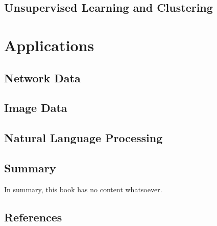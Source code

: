 \documentclass[
  letterpaper,
  DIV=11,
  numbers=noendperiod,
  oneside]{scrreprt}
\newlength{\cslhangindent}
\newlength{\cslentryspacingunit} %
\newenvironment{CSLReferences}[2] %
 {%
  \setlength{\parindent}{0pt}
  \ifodd #1
  \let\oldpar\par
  \def\par{\hangindent=\cslhangindent\oldpar}
  \fi
  \setlength{\parskip}{#2\cslentryspacingunit}
 }%
 {}
\begin{document}
\hypertarget{unsupervised-learning-and-clustering}{%
\chapter{Unsupervised Learning and
Clustering}\label{unsupervised-learning-and-clustering}}

\part{Applications}

\hypertarget{network-data}{%
\chapter{Network Data}\label{network-data}}

\hypertarget{image-data}{%
\chapter{Image Data}\label{image-data}}

\hypertarget{natural-language-processing}{%
\chapter{Natural Language
Processing}\label{natural-language-processing}}


\hypertarget{summary}{%
\chapter{Summary}\label{summary}}

In summary, this book has no content whatsoever.


\hypertarget{references}{%
\chapter*{References}\label{references}}


\hypertarget{refs}{}
\begin{CSLReferences}{0}{0}
\end{CSLReferences}

\cleardoublepage
{}
{}
\appendix
\end{document}

